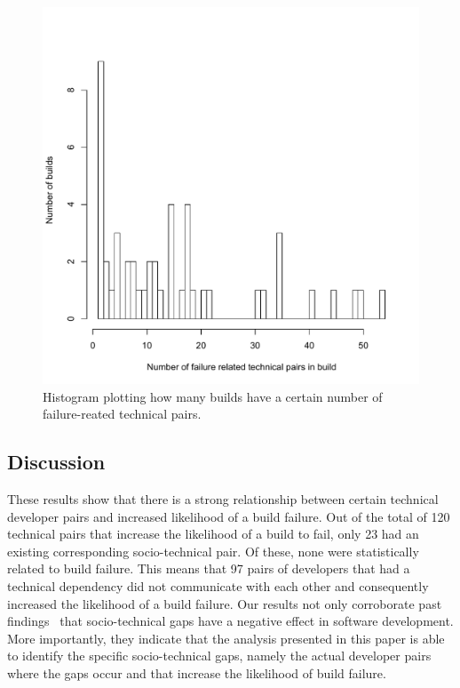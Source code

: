 \begin{figure}[t]
\centering
\vspace{-1cm}
\includegraphics[width=\columnwidth]{figures/builddistribution}
\vspace{-.75cm}
\caption{Histogram plotting how many builds have a certain number of failure-reated technical pairs.}
\label{fig:builddistribution}
\end{figure}

\subsection{Discussion}
These results show that there is a strong relationship between certain technical
developer pairs and increased likelihood of a build failure.
Out of the total of 120 technical pairs that increase the likelihood of a
build to fail, only 23 had an existing
corresponding socio-technical pair. Of these, none were statistically
related to build failure. This means that 97 pairs of developers that had a
technical dependency did not communicate with each other and
consequently increased the likelihood of a build failure. Our results not only
corroborate past findings~\cite{cataldo:cscw:2006,cataldo:esem:2008} that socio-technical gaps
have a negative effect in software development. More importantly, they indicate
that the analysis presented in this paper is able to identify the specific
socio-technical gaps, namely the actual developer pairs where the gaps occur
and that increase the likelihood of build failure. 

